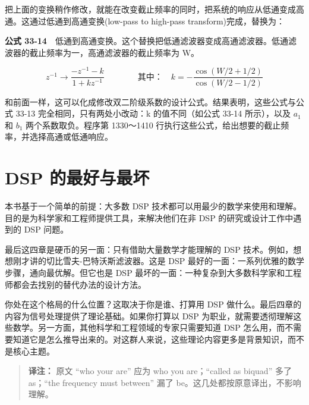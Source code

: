 把上面的变换稍作修改，就能在改变截止频率的同时，把系统的响应从低通变成高通。这通过低通到高通变换(low-pass
to high-pass transform)完成，替换为：

\textbf{公式
33-14}　低通到高通变换。这个替换把低通滤波器变成高通滤波器。低通滤波器的截止频率为一，高通滤波器的截止频率为
W。

\[z^{-1} \rightarrow \frac{-z^{-1} - k}{1 + kz^{-1}} \qquad\qquad \text{其中：}\quad k = -\frac{\cos(W/2 + 1/2)}{\cos(W/2 - 1/2)}\]

和前面一样，这可以化成修改双二阶级系数的设计公式。结果表明，这些公式与公式
33-13 完全相同，只有两处小改动：k 的值不同（如公式 33-14 所示），以及
\(a_1\) 和 \(b_1\) 两个系数取负。程序第 1330～1410
行执行这些公式，给出想要的截止频率，并选择高通或低通响应。

\section{DSP 的最好与最坏}

本书基于一个简单的前提：大多数 DSP
技术都可以用最少的数学来使用和理解。目的是为科学家和工程师提供工具，来解决他们在非
DSP 的研究或设计工作中遇到的 DSP 问题。

最后这四章是硬币的另一面：只有借助大量数学才能理解的 DSP
技术。例如，想想刚才讲的切比雪夫-巴特沃斯滤波器。这是 DSP
最好的一面：一系列优雅的数学步骤，通向最优解。但它也是 DSP
最坏的一面：一种复杂到大多数科学家和工程师都会去找别的替代办法的设计方法。

你处在这个格局的什么位置？这取决于你是谁、打算用 DSP
做什么。最后四章的内容为信号处理提供了理论基础。如果你打算以 DSP
为职业，就需要透彻理解这些数学。另一方面，其他科学和工程领域的专家只需要知道
DSP
怎么用，而不需要知道它是怎么推导出来的。对这群人来说，这些理论内容更多是背景知识，而不是核心主题。

\begin{quote}
\textbf{译注：} 原文 ``who your are'' 应为 who you are；``called as
biquad'' 多了 as；``the frequency must between'' 漏了
be。这几处都按原意译出，不影响理解。
\end{quote}
